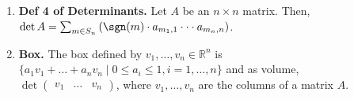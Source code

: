 \begin{enumerate}
	\item \textbf{Def 4 of Determinants. } Let $A$ be an $n \times n$ matrix. Then, $\det A = \sum_{m \in S_n} \left(\sgn(m) \cdot a_{m_1,1} \cdot \cdot \cdot a_{m_n,n}\right)$. 
	\item \textbf{Box. } The box defined by $v_1,\dots,v_n \in \mathbb{R}^n$ is $\{a_1v_1 + \dots + a_nv_n \mid 0 \leq a_i \leq 1, i =1,\dots,n\}$ and as volume, $\det \begin{pmatrix} v_1 & \dots & v_n \end{pmatrix}$, where $v_1,\dots,v_n$ are the columns of a matrix $A$. 
\end{enumerate}


